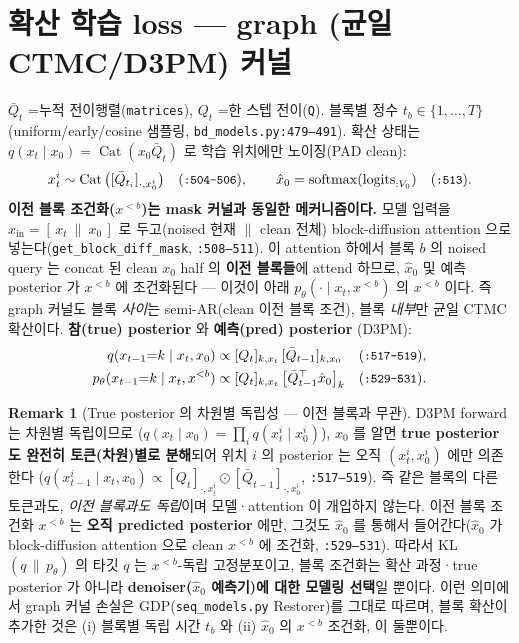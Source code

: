 \documentclass[11pt]{article}
\newcommand{\code}[1]{\texttt{\small #1}}
\newcommand{\pth}{p_\theta}
\newcommand{\Qb}{\bar{Q}}
\newcommand{\xz}{x_0}
\newcommand{\xt}{x_t}
\newcommand{\xpre}{x^{<b}}
\DeclareMathOperator{\Cat}{Cat}
\DeclareMathOperator{\softmax}{softmax}
\theoremstyle{definition}
\newtheorem{remark}{Remark}
\begin{document}
\section{확산 학습 loss — graph (균일 CTMC/D3PM) 커널}
$\Qb_t$ =누적 전이행렬(\code{matrices}), $Q_t$ =한 스텝 전이(\code{Q}). 블록별 정수
$t_b\in\{1,\dots,T\}$ (uniform/early/cosine 샘플링, \code{bd\_models.py:479--491}).
확산 상태는 $q(\xt\mid\xz)=\Cat(\xz\Qb_t)$ 로 학습 위치에만 노이징(PAD clean):
\begin{equation}
\xt^i\sim \Cat\big([\Qb_{t_i}]_{\cdot,\xz^i}\big)\quad(\code{:504--506}),\qquad
\hat{x}_0=\softmax(\text{logits}_{:V_0})\quad(\code{:513}).
\end{equation}
\textbf{이전 블록 조건화($\xpre$)는 mask 커널과 동일한 메커니즘이다.} 모델 입력을
$x_{\text{in}}=[\,\xt\ \|\ \xz\,]$ 로 두고(noised 현재 $\|$ clean 전체) block-diffusion
attention 으로 넣는다(\code{get\_block\_diff\_mask}, \code{:508--511}). 이 attention 하에서
블록 $b$ 의 noised query 는 concat 된 clean $\xz$ half 의 \textbf{이전 블록들}에 attend 하므로,
$\hat{x}_0$ 및 예측 posterior 가 $\xpre$ 에 조건화된다 — 이것이 아래 $\pth(\cdot\mid\xt,\xpre)$
의 $\xpre$ 이다. 즉 graph 커널도 블록 \emph{사이}는 semi-AR(clean 이전 블록 조건),
블록 \emph{내부}만 균일 CTMC 확산이다.
\textbf{참(true) posterior} 와 \textbf{예측(pred) posterior} (D3PM):
\begin{align}
q(x_{t-1}{=}k\mid \xt,\xz)&\propto [Q_t]_{k,\xt}\,[\Qb_{t-1}]_{k,\xz}
&&(\code{:517--519}),\\
\pth(x_{t-1}{=}k\mid \xt,\xpre)&\propto [Q_t]_{k,\xt}\,\big[\Qb_{t-1}^{\top}\hat{x}_0\big]_{k}
&&(\code{:529--531}).
\end{align}
\begin{remark}[True posterior 의 차원별 독립성 — 이전 블록과 무관]
D3PM forward 는 차원별 독립이므로 ($q(\xt\mid\xz)=\prod_i q(\xt^i\mid\xz^i)$),
$\xz$ 를 알면 \textbf{true posterior 도 완전히 토큰(차원)별로 분해}되어 위치 $i$ 의
posterior 는 오직 $(\xt^i,\xz^i)$ 에만 의존한다
($q(x_{t-1}^i\mid\xt,\xz)\propto[Q_t]_{\cdot,\xt^i}\odot[\Qb_{t-1}]_{\cdot,\xz^i}$, \code{:517--519}).
즉 같은 블록의 다른 토큰과도, \emph{이전 블록과도 독립}이며 모델·attention 이 개입하지 않는다.
이전 블록 조건화 $\xpre$ 는 \textbf{오직 predicted posterior} 에만, 그것도 $\hat x_0$ 를 통해서
들어간다($\hat x_0$ 가 block-diffusion attention 으로 clean $\xpre$ 에 조건화, \code{:529--531}).
따라서 KL$(q\,\|\,\pth)$ 의 타깃 $q$ 는 $\xpre$-독립 고정분포이고, 블록 조건화는 확산
과정·true posterior 가 아니라 \textbf{denoiser($\hat x_0$ 예측기)에 대한 모델링 선택}일 뿐이다.
이런 의미에서 graph 커널 손실은 GDP(\code{seq\_models.py} Restorer)를 그대로 따르며, 블록
확산이 추가한 것은 (i) 블록별 독립 시간 $t_b$ 와 (ii) $\hat x_0$ 의 $\xpre$ 조건화, 이 둘뿐이다.
\end{remark}
\end{document}
